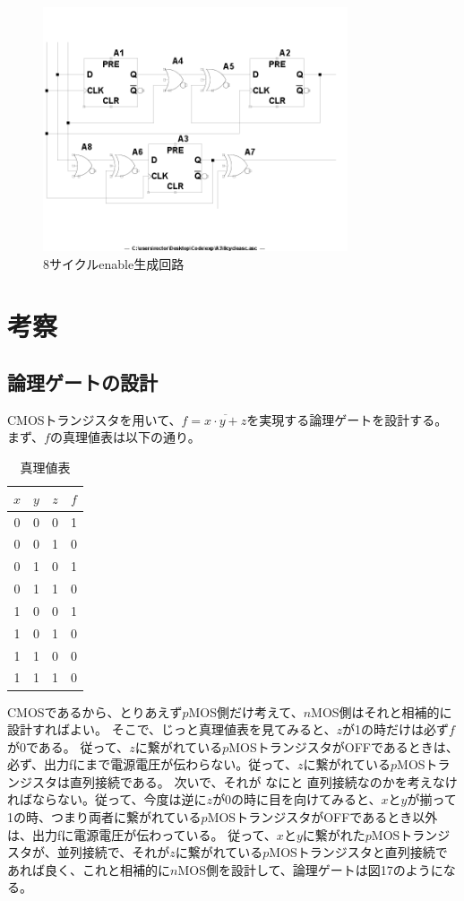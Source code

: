 \documentclass[10pt,a4j,dvipdfmx]{jsarticle}
\makeatletter
\let\@oldsec\section
\let\@oldsubsec\subsection
\renewcommand{\section}[1]{\@oldsec{#1}\vspace{-5pt}{\color{TealBlue}\hrule height 0.6pt \hfill}\par}
\renewcommand{\subsection}[1]{\vspace{-7pt}\@oldsubsec{#1}}
\makeatother
\begin{document}
\begin{figure}[H]
       \centering
       \includegraphics[width=9cm]{8cycleasc.png}
       \caption{8サイクルenable生成回路}
\end{figure}

\section{考察}
\subsection{論理ゲートの設計}
CMOSトランジスタを用いて、$f = \overline{x\cdot y+z}$を実現する論理ゲートを設計する。
まず、$f$の真理値表は以下の通り。
\begin{table}[H]
    \centering
    \caption{真理値表}
    \begin{tabular}{|c|c|c||c|} \hline
      $x$ & $y$ & $z$ & $f$ \\ \hline \hline
      0 & 0 & 0 & 1 \\
      0 & 0 & 1 & 0 \\
      0 & 1 & 0 & 1 \\
      0 & 1 & 1 & 0 \\
      1 & 0 & 0 & 1 \\
      1 & 0 & 1 & 0 \\
      1 & 1 & 0 & 0 \\
      1 & 1 & 1 & 0 \\
      \hline
    \end{tabular}
\end{table}

CMOSであるから、とりあえず$p$MOS側だけ考えて、$n$MOS側はそれと相補的に設計すればよい。
そこで、じっと真理値表を見てみると、$z$が1の時だけは必ず$f$が0である。
従って、$z$に繋がれている$p$MOSトランジスタがOFFであるときは、必ず、出力fにまで電源電圧が伝わらない。従って、$z$に繋がれている$p$MOSトランジスタは直列接続である。
次いで、それが なにと 直列接続なのかを考えなければならない。従って、今度は逆に$z$が0の時に目を向けてみると、$x$と$y$が揃って1の時、つまり両者に繋がれている$p$MOSトランジスタがOFFであるとき以外は、出力fに電源電圧が伝わっている。
従って、$x$と$y$に繋がれた$p$MOSトランジスタが、並列接続で、それが$z$に繋がれている$p$MOSトランジスタと直列接続であれば良く、これと相補的に$n$MOS側を設計して、論理ゲートは図17のようになる。
\end{document}
